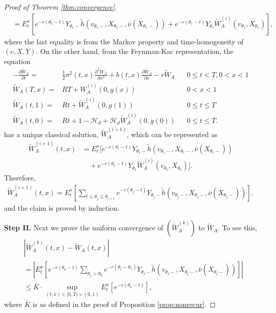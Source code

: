 \documentclass[draft, noinfoline]{ectaart}
\numberwithin{equation}{section}
\theoremstyle{plain}
\begin{document}
\begin{appendices}
\begin{proof}[Proof of Theorem \ref{thm:convergence}]
\begin{align*}
		&=E_t^x\left[e^{-r(\theta_{1}-t)}Y_{\theta_{1}-}\tilde{h}(v_{\theta_{1}-},X_{\theta_{1}-},\bar{\nu}(X_{\theta_{1}-}))+e^{-r(\theta_1-t)}Y_{\theta_1}\tilde{W}_A^{(i)}(v_{\theta_1},X_{\theta_1})\right], 
	\end{align*}
	where the last equality is from the Markov property and time-homogeneity of $(v,X,Y)$. On the other hand, from the Feynman-Kac representation, the equation
	\begin{align*}
	-\frac{\partial \tilde{W}_{A}}{\partial t}= & \frac{1}{2}\sigma^{2}(t,x)\frac{\partial^{2}\tilde{W}_{A}}{\partial x^{2}}+b(t,x)\frac{\partial \tilde{W}_{A}}{\partial x}-r \tilde{W}_{A} &  & 0\le t<T,0<x<1\\
	\tilde{W}_{A}(T,x)= & RT+W_{A}^{(i)}(0,g(x)) &  & 0<x<1\\
	\tilde{W}_{A}(t,1)= & Rt+\tilde{W}_{A}^{(i)}(0,g(1)) &  & 0\le t\le T\\
	\tilde{W}_{A}(t,0)= & Rt+1-\mathcal{H}_{d}+\mathcal{H}_{d}\tilde{W}_{A}^{(i)}(0,g(0)) &  & 0\le t\le T.
	\end{align*}
	has a unique classical solution, $\tilde{W}_A^{(i+1)}$, which can be represented as 
	\begin{align*}
		\tilde{W}_A^{(i+1)}(t,x)&=E_t^x\Bigg[e^{-r(\theta_{1}-t)}Y_{\theta_{1}-}\tilde{h}(v_{\theta_{1}-},X_{\theta_{1}-},\bar{\nu}(X_{\theta_{1}-}))\\
		&\quad+e^{-r(\theta_1-t)}Y_{\theta_1}\tilde{W}_A^{(i)}(v_{\theta_1},X_{\theta_1})\Bigg].
	\end{align*}
	Therefore, 
	\begin{align*}
		\tilde{W}_A^{(i+1)}(t,x)=E_t^x\left[\sum_{t\le \theta_j\le \theta_{i+1}}e^{-r(\theta_j-t)}Y_{\theta_j-}\tilde{h}(v_{\theta_j-},X_{\theta_j-},\bar{\nu}(X_{\theta_j-}))\right],
	\end{align*}
	and the claim is proved by induction.

	{\bf Step II.} Next we prove the uniform convergence of $(\tilde{W}_A^{(k)})$ to $\tilde{W}_A$. To see this,
	\begin{align*}
		&|\tilde{W}_A^{(k)}(t,x)-\tilde{W}_A(t,x)|\\
		&=\left|E_t^x\left[e^{-r(\theta_k-t)}\sum_{\theta_j> \theta_{k}}e^{-r(\theta_j-\theta_k)}Y_{\theta_j-}\tilde{h}(v_{\theta_j-},X_{\theta_j-},\bar{\nu}(X_{\theta_j-}))\right]\right|\\
		&\le \bar{K}\cdot \sup_{(t,x)\in[0,T)\times(0,1)}E_t^x\left[e^{-r(\theta_k-t)}\right],
	\end{align*}
	where $\bar{K}$ is as defined in the proof of Proposition \ref{prop:nonrecur}. 


\end{proof}
\end{appendices}
\end{document}
